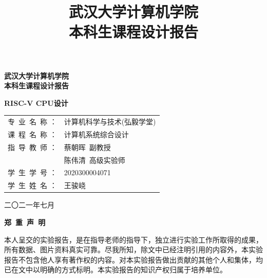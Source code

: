 \documentclass[UTF8,a4paper,autofakebold,15pt]{ctexart}
\title{武汉大学计算机学院\\
	本科生课程设计报告
}
\author{}
\date{}
\begin{document}
	
	\begin{center}
		
	\vspace{50pt}
	{\bf{} 武汉大学计算机学院\\\vspace{10pt}
		本科生课程设计报告}
	
	\vspace{50pt}
	
	{\bf RISC-V CPU设计}
	
	\vspace{100pt}
	
	\begin{spacing}{1.5}
	\qquad\begin{tabular}{ll}
		专\ 业\ 名\ 称   ：&计算机科学与技术(弘毅学堂)\\
		
		课\ 程\ 名\ 称   ：&计算机系统综合设计\\
		
		指\ 导\ 教\ 师   ：&蔡朝晖\ 副教授\\
		&陈伟清\ 高级实验师\\
		
		学\ 生\ 学\ 号   ：&2020300004071\\
		
		学\ 生\ 姓\ 名   ：&王骏峣
	\end{tabular}

	\end{spacing}

	\vspace{100pt}

	 二〇二一年七月
	
	\end{center}
	

\newpage

	\begin{center}
	{\bf 郑\ 重\ 声\ 明}
	\end{center}

	\vspace{20pt}
	
	本人呈交的实验报告，是在指导老师的指导下，独立进行实验工作所取得的成果，所有数据、图片资料真实可靠。尽我所知，除文中已经注明引用的内容外，本实验报告不包含他人享有著作权的内容。对本实验报告做出贡献的其他个人和集体，均已在文中以明确的方式标明。本实验报告的知识产权归属于培养单位。
	
	\vspace{20pt}
	
\end{document}

